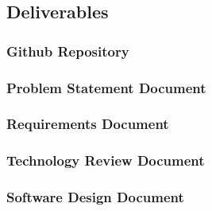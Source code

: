 \subsection{Deliverables}
\subsubsection{Github Repository}
\subsubsection{Problem Statement Document}
\subsubsection{Requirements Document}
\subsubsection{Technology Review Document}
\subsubsection{Software Design Document}